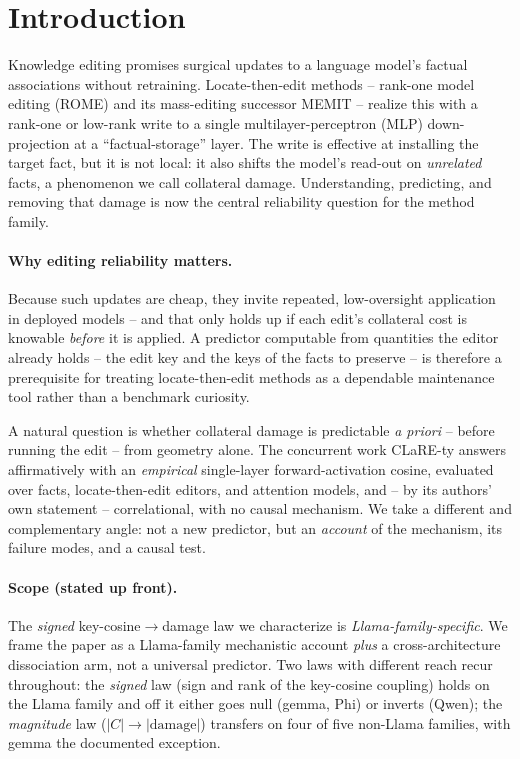 \section{Introduction}
\label{sec:intro}


Knowledge editing promises surgical updates to a language model's factual
associations without retraining. Locate-then-edit methods -- rank-one model
editing (ROME) \citep{meng2022rome} and its mass-editing successor MEMIT
\citep{meng2023memit} -- realize this with a rank-one or low-rank
write to a single multilayer-perceptron (MLP) down-projection at a
``factual-storage'' layer. The
write is effective at installing the target fact, but it is not local: it
also shifts the model's read-out on \emph{unrelated} facts, a phenomenon we
call collateral damage. Understanding, predicting, and removing that damage is
now the central reliability question for the method family.

\paragraph{Why editing reliability matters.} Because such updates are cheap,
they invite repeated, low-oversight application in deployed models -- and that
only holds up if each edit's collateral cost is knowable \emph{before} it is
applied. A predictor computable from quantities the editor already holds --
the edit key and the keys of the facts to preserve -- is therefore a
prerequisite for treating locate-then-edit methods as a dependable maintenance
tool rather than a benchmark curiosity.

A natural question is whether collateral damage is predictable
\emph{a priori} -- before running the edit -- from geometry alone. The
concurrent work CLaRE-ty \citep{clarety2026} answers affirmatively with an
\emph{empirical} single-layer forward-activation cosine, evaluated over
\clareNfacts{} facts, \clareNeditors{} locate-then-edit editors, and
\clareNmodels{} attention models, and -- by its authors' own statement --
correlational, with no causal mechanism. We take a different and complementary
angle: not a new predictor, but an \emph{account} of the mechanism, its
failure modes, and a causal test.

\paragraph{Scope (stated up front).} The \emph{signed} key-cosine$\rightarrow$damage
law we characterize is \emph{Llama-family-specific}. We frame the paper as a
Llama-family mechanistic account \emph{plus} a cross-architecture dissociation
arm, not a universal predictor. Two laws with different reach recur throughout:
the \emph{signed} law (sign and rank of the key-cosine coupling) holds on the
Llama family and off it either goes null (gemma, Phi) or inverts (Qwen); the
\emph{magnitude} law ($|C|\rightarrow|\text{damage}|$) transfers on four of five
non-Llama families, with gemma the documented exception.

